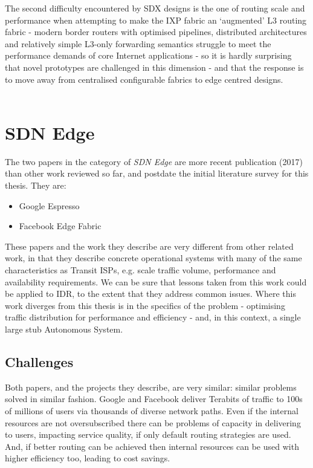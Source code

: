 The second difficulty encountered by SDX designs is the one of routing scale and performance when attempting to make the IXP fabric an `augmented' L3 routing fabric - modern border routers with optimised pipelines, distributed architectures and relatively simple L3-only forwarding semantics struggle to meet the performance demands of core Internet applications - so it is hardly surprising that novel prototypes are challenged in this dimension - and that the response is to move away from centralised configurable fabrics to edge centred designs.
\\
\\

\section{SDN Edge}

The two papers in the category of \textit{SDN Edge} are more recent publication (2017) than other work reviewed so far, and postdate the initial literature survey for this thesis. They are:

\begin{itemize}[noitemsep,nolistsep]
	\item{Google Espresso \cite{Yap2017}}
	\item{Facebook Edge Fabric\cite{Schlinker2017}}
\end{itemize}
These papers and the work they describe are very different from other related work, in that they describe concrete operational systems with many of the same characteristics as Transit ISPs, e.g. scale traffic volume, performance and availability requirements.
We can be sure that lessons taken from this work could be applied to IDR, to the extent that they address common issues.
Where this work diverges from this thesis is in the specifics of the problem - optimising traffic distribution for performance and efficiency - and, in this context, a single large stub Autonomous System.

\subsection{Challenges}
Both papers, and the projects they describe, are very similar: similar problems solved in similar fashion.
Google and Facebook deliver Terabits of traffic to 100s of millions of users via thousands of diverse network paths.
Even if the internal resources are not oversubscribed there can be problems of capacity in delivering to users, impacting service quality, if only default routing strategies are used.
And, if better routing can be achieved then internal resources can be used with higher efficiency too, leading to cost savings.

